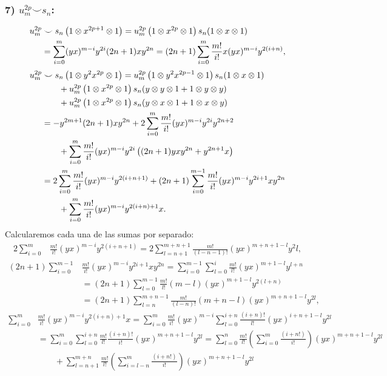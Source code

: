 \documentclass[fleqn,../tesis.tex]{subfiles}
\begin{document}
\subsubsection{7) $u_m^{2p} \smile s_n$:}
\begin{align*}
	u_m^{2p}& \smile s_n\left(1 \otimes x^{2p + 1} \otimes 1\right)
		= u_m^{2p}\left(1 \otimes x^{2p} \otimes 1\right)s_n(1 \otimes x \otimes 1)\\
	&= \sum_{i = 0}^{m}(yx)^{m  -i}y^{2i}(2n + 1)xy^{2n}
		= (2n + 1)\sum_{i = 0}^{m}\frac{m!}{i!} x(yx)^{m  -i}y^{2(i + n)},
\end{align*}
\begin{align*}
	u_m^{2p}& \smile s_n\left(1 \otimes y^2x^{2p} \otimes 1\right)
		= u_m^{2p}\left(1 \otimes y^2x^{2p - 1} \otimes 1\right)s_n(1 \otimes x \otimes 1)\\
	&\qquad + u_m^{2p}\left(1 \otimes x^{2p} \otimes 1\right)s_n(y \otimes y \otimes 1 + 1 \otimes y \otimes y)\\
	&\qquad + u_m^{2p}\left(1 \otimes x^{2p} \otimes 1\right)s_n(y \otimes x \otimes 1 + 1 \otimes x \otimes y)\\
	&= -y^{2m + 1}(2n + 1)xy^{2n} + 2\sum_{i = 0}^{m}\frac{m!}{i!}(yx)^{m - i}y^{2i}y^{2n + 2}\\
	&\qquad + \sum_{i = 0}^{m}\frac{m!}{i!}(yx)^{m - i}y^{2i}\left((2n + 1)yxy^{2n} + y^{2n + 1}x\right)\\
	&= 2\sum_{i = 0}^{m}\frac{m!}{i!}(yx)^{m - i}y^{2(i + n + 1)}
		+ (2n + 1)\sum_{i = 0}^{m - 1}\frac{m!}{i!}(yx)^{m - i}y^{2i + 1}xy^{2n}\\
	&\qquad+ \sum_{i = 0}^{m}\frac{m!}{i!}(yx)^{m - i}y^{2(i + n) + 1}x.
\end{align*}
Calcularemos cada una de las sumas por separado:
\begin{align*}
	2\sum_{i = 0}^{m} & \frac{m!}{i!}(yx)^{m - i}y^{2(i + n + 1)} =
		2\sum_{l = n + 1}^{m + n + 1}\frac{m!}{(l - n - 1)!}(yx)^{m + n + 1 - l}y^2l,
\end{align*}
\begin{align*}
	(2n + 1)\sum_{i = 0}^{m - 1} &\frac{m!}{i!}(yx)^{m - i}y^{2i + 1}xy^{2n} =
		\sum_{i = 0}^{m - 1}\sum_{l = 0}^{i}\frac{m!}{l!}(yx)^{m + 1 - l}y^{l + n}\\
	&=(2n + 1)\sum_{l = 0}^{m - 1}\frac{m!}{l!}(m - l)(yx)^{m + 1 - l}y^{2(l + n)}\\
	&= (2n + 1)\sum_{l = n}^{m + n - 1}\frac{m!}{(l - n)!}(m + n - l)(yx)^{m + n + 1 - l}y^{2l},
\end{align*}
\begin{align*}
	\sum_{i = 0}^{m} & \frac{m!}{i!}(yx)^{m - i}y^{2(i + n) + 1}x =
		\sum_{i = 0}^{m}\frac{m!}{i!}(yx)^{m - i}\sum_{l = 0}^{i + n}\frac{(i +n)!}{l!}(yx)^{i + n + 1 - l}y^{2l}\\
	&= \sum_{i = 0}^{m}\sum_{l = 0}^{i + n}\frac{m!}{l!}\frac{(i + n)!}{i!}(yx)^{m + n + 1 - l}y^{2l}
		= \sum_{l = 0}^{n}\frac{m!}{l!}\left(\sum_{i = 0}^{m}\frac{(i + n!)}{i!}\right)(yx)^{m + n + 1 - l}y^{2l}\\
		&\qquad +\sum_{l = n + 1}^{m + n}\frac{m!}{l!}\left(\sum_{i = l - n}^{m}\frac{(i + n!)}{i!}\right)(yx)^{m + n + 1 - l}y^{2l}
\end{align*}
\end{document}
